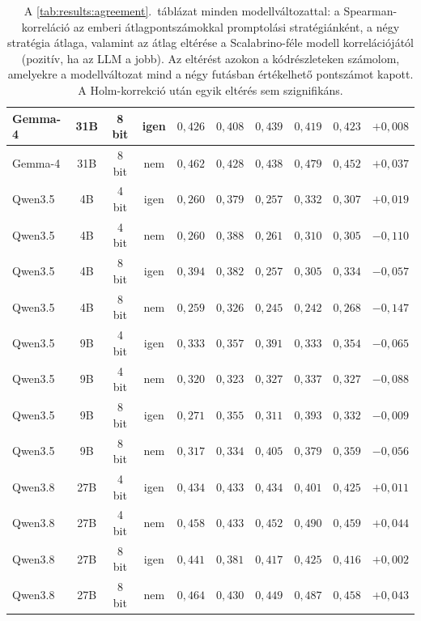 \documentclass[
]{elteikthesis}[2024/04/26]
\begin{document}
\begin{table}[htbp]
{\begin{tabular}{ | l | c | c | c | r | r | r | r | r | r | }
		\hline
		Gemma-4 & 31B & 8 bit & igen & $0{,}426$ & $0{,}408$ & $0{,}439$ & $0{,}419$ & $0{,}423$ & $+0{,}008$ \\
		\hline
		Gemma-4 & 31B & 8 bit & nem & $0{,}462$ & $0{,}428$ & $0{,}438$ & $0{,}479$ & $0{,}452$ & $+0{,}037$ \\
		\hline
		Qwen3.5 & 4B & 4 bit & igen & $0{,}260$ & $0{,}379$ & $0{,}257$ & $0{,}332$ & $0{,}307$ & $+0{,}019$ \\
		\hline
		Qwen3.5 & 4B & 4 bit & nem & $0{,}260$ & $0{,}388$ & $0{,}261$ & $0{,}310$ & $0{,}305$ & $-0{,}110$ \\
		\hline
		Qwen3.5 & 4B & 8 bit & igen & $0{,}394$ & $0{,}382$ & $0{,}257$ & $0{,}305$ & $0{,}334$ & $-0{,}057$ \\
		\hline
		Qwen3.5 & 4B & 8 bit & nem & $0{,}259$ & $0{,}326$ & $0{,}245$ & $0{,}242$ & $0{,}268$ & $-0{,}147$ \\
		\hline
		Qwen3.5 & 9B & 4 bit & igen & $0{,}333$ & $0{,}357$ & $0{,}391$ & $0{,}333$ & $0{,}354$ & $-0{,}065$ \\
		\hline
		Qwen3.5 & 9B & 4 bit & nem & $0{,}320$ & $0{,}323$ & $0{,}327$ & $0{,}337$ & $0{,}327$ & $-0{,}088$ \\
		\hline
		Qwen3.5 & 9B & 8 bit & igen & $0{,}271$ & $0{,}355$ & $0{,}311$ & $0{,}393$ & $0{,}332$ & $-0{,}009$ \\
		\hline
		Qwen3.5 & 9B & 8 bit & nem & $0{,}317$ & $0{,}334$ & $0{,}405$ & $0{,}379$ & $0{,}359$ & $-0{,}056$ \\
		\hline
		Qwen3.8 & 27B & 4 bit & igen & $0{,}434$ & $0{,}433$ & $0{,}434$ & $0{,}401$ & $0{,}425$ & $+0{,}011$ \\
		\hline
		Qwen3.8 & 27B & 4 bit & nem & $0{,}458$ & $0{,}433$ & $0{,}452$ & $0{,}490$ & $0{,}459$ & $+0{,}044$ \\
		\hline
		Qwen3.8 & 27B & 8 bit & igen & $0{,}441$ & $0{,}381$ & $0{,}417$ & $0{,}425$ & $0{,}416$ & $+0{,}002$ \\
		\hline
		Qwen3.8 & 27B & 8 bit & nem & $0{,}464$ & $0{,}430$ & $0{,}449$ & $0{,}487$ & $0{,}458$ & $+0{,}043$ \\
		\hline
	\end{tabular}}
	\caption[A modellváltozatok Spearman-korrelációja (minden modellváltozat)]{A
	\ref{tab:results:agreement}.~táblázat minden modellváltozattal: a Spearman-korreláció az emberi
	átlagpontszámokkal promptolási stratégiánként, a négy stratégia átlaga, valamint az átlag eltérése a
	Scalabrino-féle modell korrelációjától (pozitív, ha az LLM a jobb).
	Az eltérést azokon a kódrészleteken számolom, amelyekre a modellváltozat mind a négy futásban
	értékelhető pontszámot kapott.
	A Holm-korrekció után egyik eltérés sem szignifikáns.}
	\label{tab:app:agreement}
\end{table}
\end{document}
